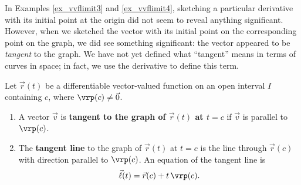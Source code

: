 In Examples \ref{ex_vvflimit3} and \ref{ex_vvflimit4}, sketching a particular derivative with its initial point at the origin did not seem to reveal anything significant. However, when we sketched the vector with its initial point on the corresponding point on the graph, we did see something significant: the vector appeared to be \emph{tangent} to the graph. We have not yet defined what ``tangent'' means in terms of curves in space; in fact, we use the derivative to define this term.

\begin{definition}\label{def:vector_tangent}
Let $\vec r(t)$ be a differentiable vector-valued function on an open interval $I$ containing $c$, where $\vrp(c)\neq \vec 0$.
\begin{enumerate}
	\item A vector $\vec v$ is \textbf{tangent to the graph of $\vec r(t)$ at $t=c$} if $\vec v$ is parallel to $\vrp(c)$.
	\item	The \textbf{tangent line}  to the graph of $\vec r(t)$ at $t=c$ is the line through $\vec r(c)$ with direction parallel to $\vrp(c)$. An equation of the tangent line is 
	\[\vec \ell(t) = \vec r(c) + t\,\vrp(c).\]
\end{enumerate}
\end{definition}

